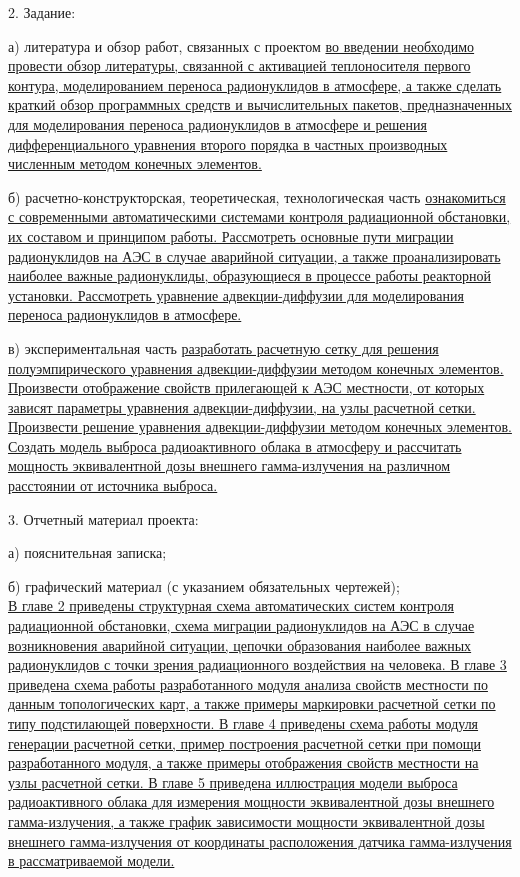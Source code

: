 2. Задание:

\hspace{1cm} а) литература и обзор работ, связанных с проектом \ul{во введении необходимо провести обзор литературы, связанной с 
активацией теплоносителя первого контура, моделированием переноса радионуклидов в атмосфере, а также сделать краткий 
обзор программных средств и вычислительных пакетов, предназначенных для моделирования переноса радионуклидов в атмосфере 
и решения дифференциального уравнения второго порядка в частных производных численным методом конечных элементов.}

\hspace{1cm} б) расчетно-конструкторская, теоретическая, технологическая часть \ul{ознакомиться с современными 
автоматическими системами контроля радиационной обстановки, их составом и принципом работы. Рассмотреть основные пути 
миграции радионуклидов на АЭС в случае аварийной ситуации, а также проанализировать наиболее важные радионуклиды,
образующиеся в процессе работы реакторной установки. Рассмотреть уравнение адвекции-диффузии для моделирования переноса 
радионуклидов в атмосфере.}

\hspace{1cm} в) экспериментальная часть \ul{разработать расчетную сетку для решения полуэмпирического уравнения 
адвекции-диффузии методом конечных элементов. Произвести отображение свойств прилегающей к АЭС местности, от которых 
зависят параметры уравнения адвекции-диффузии, на узлы расчетной сетки. Произвести решение уравнения адвекции-диффузии 
методом конечных элементов. Создать модель выброса радиоактивного облака в атмосферу и рассчитать мощность эквивалентной 
дозы внешнего гамма-излучения на различном расстоянии от источника выброса.}

3. Отчетный материал проекта:

\hspace{1cm} а) пояснительная записка;

\hspace{1cm} б) графический материал (с указанием обязательных чертежей); \\
\ul{В главе 2 приведены структурная схема автоматических систем контроля радиационной обстановки, схема миграции 
радионуклидов на АЭС в случае возникновения аварийной ситуации, цепочки образования наиболее важных радионуклидов с 
точки зрения радиационного воздействия на человека. В главе 3 приведена схема работы разработанного модуля анализа 
свойств местности по данным топологических карт, а также примеры маркировки расчетной сетки по типу подстилающей 
поверхности. В главе 4 приведены схема работы модуля генерации расчетной сетки, пример построения расчетной 
сетки при помощи разработанного модуля, а также примеры отображения свойств местности на узлы расчетной сетки. В главе 
5 приведена иллюстрация модели выброса радиоактивного облака для измерения мощности эквивалентной дозы внешнего гамма-излучения, 
а также график зависимости мощности эквивалентной дозы внешнего гамма-излучения от координаты расположения датчика 
гамма-излучения в рассматриваемой модели.}

